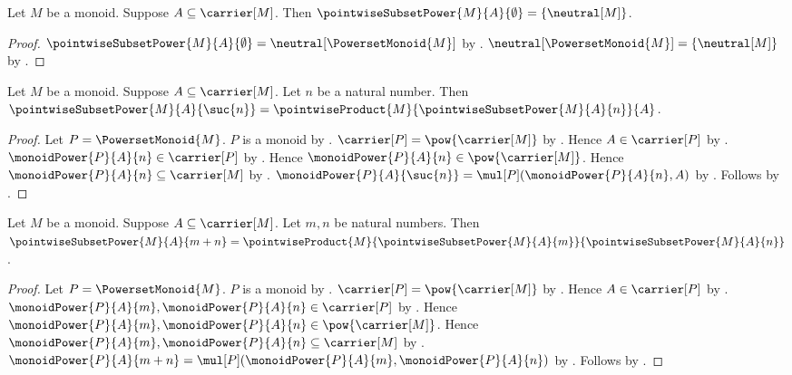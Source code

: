 \begin{proposition}\label{pointwise_subset_power_zero}
    Let $M$ be a monoid.
    Suppose $A\subseteq\carrier[M]$.
    Then $\pointwiseSubsetPower{M}{A}{\emptyset}
        =\{\neutral[M]\}$.
\end{proposition}
\begin{proof}
    $\pointwiseSubsetPower{M}{A}{\emptyset}
        =\neutral[\PowersetMonoid{M}]$ by
        .
    $\neutral[\PowersetMonoid{M}]=\{\neutral[M]\}$ by
        .
\end{proof}

\begin{proposition}\label{pointwise_subset_power_successor}
    Let $M$ be a monoid.
    Suppose $A\subseteq\carrier[M]$.
    Let $n$ be a natural number.
    Then $\pointwiseSubsetPower{M}{A}{\suc{n}}
        =\pointwiseProduct{M}{\pointwiseSubsetPower{M}{A}{n}}{A}$.
\end{proposition}
\begin{proof}
    Let $P=\PowersetMonoid{M}$.
    $P$ is a monoid by .
    $\carrier[P]=\pow{\carrier[M]}$ by
        .
    Hence $A\in\carrier[P]$ by .
    $\monoidPower{P}{A}{n}\in\carrier[P]$ by
        .
    Hence $\monoidPower{P}{A}{n}\in\pow{\carrier[M]}$.
    Hence $\monoidPower{P}{A}{n}\subseteq\carrier[M]$ by
        .
    $\monoidPower{P}{A}{\suc{n}}
        =\mul[P](\monoidPower{P}{A}{n},A)$ by
        .
    Follows by
        .
\end{proof}

\begin{theorem}\label{pointwise_subset_power_addition}
    Let $M$ be a monoid.
    Suppose $A\subseteq\carrier[M]$.
    Let $m,n$ be natural numbers.
    Then $\pointwiseSubsetPower{M}{A}{m+n}
        =\pointwiseProduct{M}{\pointwiseSubsetPower{M}{A}{m}}
            {\pointwiseSubsetPower{M}{A}{n}}$.
\end{theorem}
\begin{proof}
    Let $P=\PowersetMonoid{M}$.
    $P$ is a monoid by .
    $\carrier[P]=\pow{\carrier[M]}$ by
        .
    Hence $A\in\carrier[P]$ by .
    $\monoidPower{P}{A}{m},\monoidPower{P}{A}{n}\in\carrier[P]$ by
        .
    Hence $\monoidPower{P}{A}{m},\monoidPower{P}{A}{n}
        \in\pow{\carrier[M]}$.
    Hence $\monoidPower{P}{A}{m},\monoidPower{P}{A}{n}
        \subseteq\carrier[M]$ by .
    $\monoidPower{P}{A}{m+n}
        =\mul[P](\monoidPower{P}{A}{m},\monoidPower{P}{A}{n})$ by
        .
    Follows by
        .
\end{proof}

